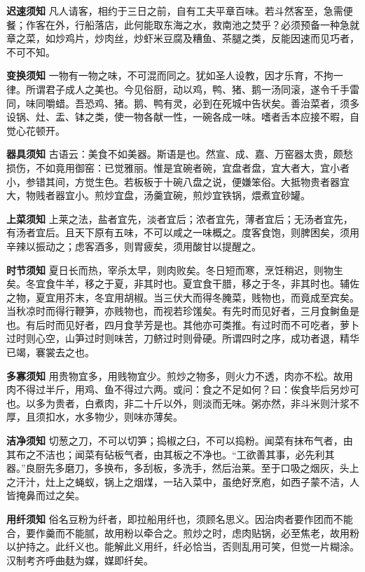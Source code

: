 \documentclass[]{article}
\begin{document}
\textbf{迟速须知}
凡人请客，相约于三日之前，自有工夫平章百味。若斗然客至，急需便餐；作客在外，行船落店，此何能取东海之水，救南池之焚乎？必须预备一种急就章之菜，如炒鸡片，炒肉丝，炒虾米豆腐及糟鱼、茶腿之类，反能因速而见巧者，不可不知。

\textbf{变换须知}
一物有一物之味，不可混而同之。犹如圣人设教，因才乐育，不拘一律。所谓君子成人之美也。今见俗厨，动以鸡，鸭、猪、鹅一汤同滚，遂令千手雷同，味同嚼蜡。吾恐鸡、猪。鹅、鸭有灵，必到在死城中告状矣。善治菜者，须多设锅、灶、盂、钵之类，使一物各献一性，一碗各成一味。嗜者舌本应接不暇，自觉心花顿开。

\textbf{器具须知}
古语云：美食不如美器。斯语是也。然宣、成、嘉、万窑器太贵，颇愁损伤，不如竟用御窑：已觉雅丽。惟是宜碗者碗，宜盘者盘，宜大者大，宜小者小，参错其间，方觉生色。若板板于十碗八盘之说，便嫌笨俗。大抵物贵者器宜大，物贱者器宜小。煎炒宜盘，汤羹宜碗，煎炒宜铁锅，煨煮宜砂罐。

\textbf{上菜须知}
上莱之法，盐者宜先，淡者宜后；浓者宜先，薄者宜后；无汤者宜先，有汤者宜后。且天下原有五味，不可以咸之一味概之。度客食饱，则脾困矣，须用辛辣以振动之；虑客酒多，则胃疲矣，须用酸甘以提醒之。

\textbf{时节须知}
夏日长而热，宰杀太早，则肉败矣。冬日短而寒，烹饪稍迟，则物生矣。冬宜食牛羊，移之于夏，非其时也。夏宜食干腊，移之于冬，非其时也。辅佐之物，夏宜用芥末，冬宜用胡椒。当三伏大而得冬腌菜，贱物也，而竟成至宾矣。当秋凉时而得行鞭笋，亦贱物也，而视若珍馐矣。有先时而见好者，三月食鲥鱼是也。有后时而见好者，四月食芋芳是也。其他亦可类推。有过时而不可吃者，萝卜过时则心空，山笋过时则味苦，刀鲚过时则骨硬。所谓四时之序，成功者退，精华已竭，褰裳去之也。

\textbf{多寡须知}
用贵物宜多，用贱物宜少。煎炒之物多，则火力不透，肉亦不松。故用肉不得过半斤，用鸡、鱼不得过六两。或问：食之不足如何？曰：俟食毕后另炒可也。以多为贵者，白煮肉，非二十斤以外，则淡而无味。粥亦然，非斗米则汁浆不厚，且须扣水，水多物少，则味亦薄矣。

\textbf{洁净须知}
切葱之刀，不可以切笋；捣椒之臼，不可以捣粉。闻菜有抹布气者，由其布之不洁也；闻菜有砧板气者，由其板之不净也。``工欲善其事，必先利其器。''良厨先多磨刀，多换布，多刮板，多洗手，然后治莱。至于口吸之烟灰，头上之汗汁，灶上之蝇蚁，锅上之烟煤，一玷入菜中，虽绝好烹庖，如西子蒙不洁，人皆掩鼻而过之矣。

\textbf{用纤须知}
俗名豆粉为纤者，即拉船用纤也，须顾名思义。因治肉者要作团而不能合，要作羹而不能腻，故用粉以牵合之。煎炒之时，虑肉贴锅，必至焦老，故用粉以护持之。此纤义也。能解此义用纤，纤必恰当，否则乱用可笑，但觉一片糊涂。汉制考齐呼曲麸为媒，媒即纤矣。
\end{document}
